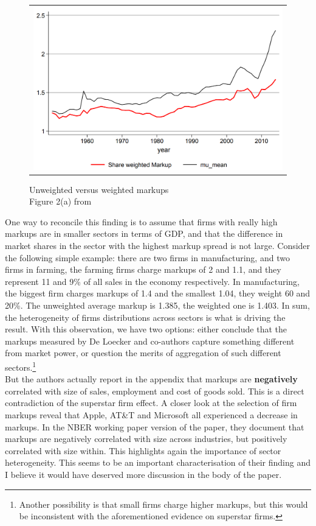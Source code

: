 \documentclass{amsart}
\theoremstyle{definition}
\theoremstyle{remark}
\numberwithin{equation}{section}
\begin{document}
\begin{figure}[h!]
    \centering
    \begin{tabular}{c}
        \includegraphics[width=0.8 \textwidth]{unweighted_markups.PNG}
    \end{tabular}
    \centering
    \caption{Unweighted versus weighted markups \\ Figure 2(a) from \cite{deloecker2017rise}}
    \label{fig:unweighted}
\end{figure}

One way to reconcile this finding is to assume that firms with really high markups are in smaller sectors in terms of GDP, and that the difference in market shares in the sector with the highest markup spread is not large. Consider the following simple example: there are two firms in manufacturing, and two firms in farming, the farming firms charge markups of 2 and 1.1, and they represent 11 and 9\% of all sales in the economy respectively. In manufacturing, the biggest firm charges markups of 1.4 and the smallest 1.04, they weight 60 and 20\%. The unweighted average markup is 1.385, the weighted one is 1.403. In sum, the heterogeneity of firms distributions across sectors is what is driving the result. With this observation, we have two options: either conclude that the markups measured by De Loecker and co-authors capture something different from market power, or question the merits of aggregation of such different sectors.\footnote{Another possibility is that small firms charge higher markups, but this would be inconsistent with the aforementioned evidence on superstar firms.}\\

But the authors actually report in the appendix that markups are \textbf{negatively} correlated with size of sales, employment and cost of goods sold. This is a direct contradiction of the superstar firm effect. A closer look at the selection of firm markups reveal that Apple, AT\&T and Microsoft all experienced a decrease in markups. In the NBER working paper version of the paper, they document that markups are negatively correlated with size across industries, but positively correlated with size within. This highlights again the importance of sector heterogeneity. This seems to be an important characterisation of their finding and I believe it would have deserved more discussion in the body of the paper. \\
\end{document}

